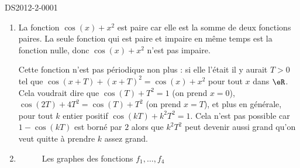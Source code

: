 \begin{corrige}{DS2012-2-0001}

\begin{enumerate}  
  \item La fonction $\cos(x)+x^2$ est paire car elle est la somme de deux fonctions paires. La seule fonction qui est paire et impaire en m\^eme temps est la fonction nulle, donc $\cos(x)+x^2$ n'est pas impaire. 

    Cette fonction n'est pas p\'eriodique non plus : si elle l'\'etait il y aurait $T> 0$ tel que $\cos(x+T)+(x+T)^2 = \cos(x)+x^2$ pour tout $x$ dans $\eR$. Cela voudrait dire que  $\cos(T)+T^2 = 1$ (on prend $x=0$), $\cos(2T)+4T^2=\cos(T)+T^2$ (on prend $x= T$), et plus en générale, pour tout $k$ entier positif $ \cos(kT)+k^2T^2=1$. Cela n'est pas possible car $1-\cos(kT)$ est borné par $2$ alors que $k^2T^2$ peut devenir aussi grand qu'on veut quitte à prendre $k$ assez grand.   

  \item 
    \begin{figure}[ht!]
      \begin{center}
      \end{center}
      \caption{Les graphes des fonctions $f_1,\ldots, f_4$}
      
    \end{figure}
    
  \end{enumerate}
\end{corrige}
